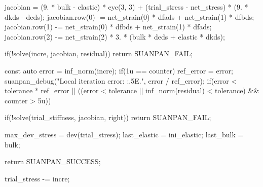 \begin{cppcode}
{{        jacobian = (9. * bulk - elastic) * eye(3, 3) + (trial_stress - net_stress) * (9. * dkds - deds);
        jacobian.row(0) -= net_strain(0) * dfads + net_strain(1) * dfbds;
        jacobian.row(1) -= net_strain(0) * dfbds + net_strain(1) * dfads;
        jacobian.row(2) -= net_strain(2) * 3. * (bulk * deds + elastic * dkds);

        if(!solve(incre, jacobian, residual)) return SUANPAN_FAIL;

        const auto error = inf_norm(incre);
        if(1u == counter) ref_error = error;
        suanpan_debug("Local iteration error: {:.5E}.\n", error / ref_error);
        if(error < tolerance * ref_error || ((error < tolerance || inf_norm(residual) < tolerance) && counter > 5u)) {
            if(!solve(trial_stiffness, jacobian, right)) return SUANPAN_FAIL;

            max_dev_stress = dev(trial_stress);
            last_elastic = ini_elastic;
            last_bulk = bulk;

            return SUANPAN_SUCCESS;
        }

        trial_stress -= incre;
    }
}
\end{cppcode}

